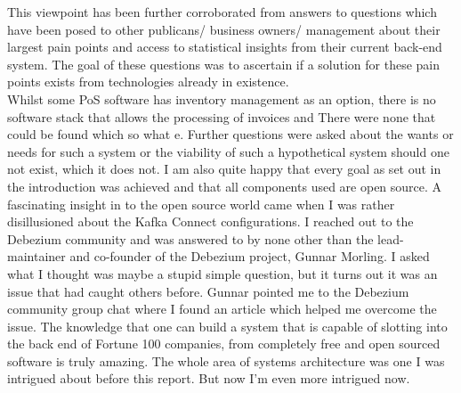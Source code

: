 \begin{flushleft}
	This viewpoint has been further corroborated from answers to questions which have been posed to other publicans/ business owners/ management about their largest pain points and access to statistical insights from their current back-end system. 
	The goal of these questions was to ascertain if a solution for these pain points exists from technologies already in existence.\\ Whilst some PoS software has inventory management as an option, there is no software stack that allows the processing 
	of invoices and There were none that could be found which so what e. Further questions were asked about the wants or needs for such a 
	system or the viability of such a hypothetical system should one not exist, which it does not.
	\bigbreak
	I am also quite happy that every goal as set out in the introduction was achieved and that all components used are open source.
	A fascinating insight in to the open source world came when I was rather disillusioned about the Kafka Connect configurations. I reached out to the
	Debezium community and was answered to by none other than the lead-maintainer and co-founder of the Debezium project, Gunnar Morling. I asked
	what I thought was maybe a stupid simple question, but it turns out it was an issue that had caught others before. Gunnar pointed me to
	the Debezium community group chat where I found an article which helped me overcome the issue.\newline
	The knowledge that one can build a system that is capable of slotting into the back end of Fortune 100 companies, from completely free
	and open sourced software is truly amazing. The whole area of systems architecture was one I was intrigued about before this report. But now
	I'm even more intrigued now.
\end{flushleft}